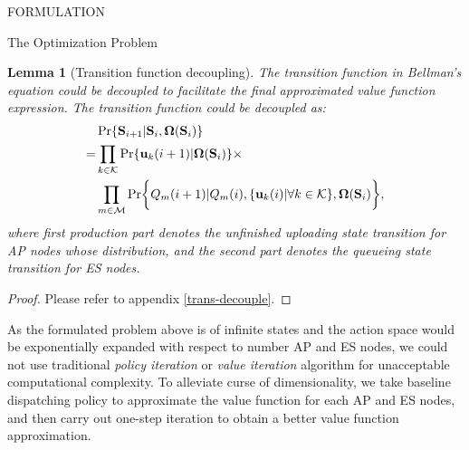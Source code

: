 \documentclass[10pt, conference, letterpaper]{IEEEtran}
\newtheorem{lemma}{Lemma}
\renewcommand{\vec}{\mathbf}
\DeclarePairedDelimiter{\set}{\{}{\}}
\DeclarePairedDelimiter{\Brace}{\bigg\{}{\bigg\}}
\newcommand{\apSet}{\mathcal{K}}
\newcommand{\esSet}{\mathcal{M}}
\newcommand{\Stat}{\mathbf{S}}
\newcommand{\Policy}{\mathbf{\Omega}}
\begin{document}
\begin{section}{FORMULATION}
\begin{subsection}{The Optimization Problem}
            \begin{lemma}[Transition function decoupling]
                The transition function in Bellman's equation could be decoupled to facilitate the final approximated value function expression. The transition function could be decoupled as:
                \begin{align}
                    & \Pr\{\Stat_{i+1}|\Stat_{i}, \Policy(\Stat_{i})\} 
                    \nonumber\\
                    =& \prod_{k\in\apSet} \Pr\{\vec{u}_k(i+1)|\Policy(\Stat_{i})\} \times
                        \nonumber\\
                        & \prod_{m\in\esSet}
                            \Pr \Brace{Q_m(i+1)|Q_m(i), \set{\vec{u}_k(i)|\forall k\in\apSet}, \Policy(\Stat_{i})},
                \end{align}
                where first production part denotes the unfinished uploading state transition for AP nodes whose distribution, and the second part denotes the queueing state transition for ES nodes.
            \end{lemma}
            \begin{proof}
                Please refer to appendix \ref{trans-decouple}.
            \end{proof}

            As the formulated problem above is of infinite states and the action space would be exponentially expanded with respect to number AP and ES nodes, we could not use traditional \emph{policy iteration} or \emph{value iteration} algorithm \cite{sutton1998introduction} for unacceptable computational complexity. To alleviate curse of dimensionality, we take baseline dispatching policy to approximate the value function for each AP and ES nodes, and then carry out one-step iteration to obtain a better value function approximation.
        \end{subsection}
    \end{section}
\end{document}

